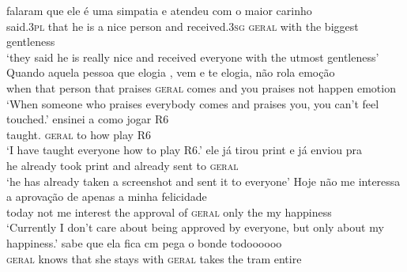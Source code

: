 \documentclass[output=paper]{langscibook}
\begin{document}
\ea\label{ex:avelar:25}
 \ea\label{ex:avelar:25a}
  \gll falaram   que   ele   é   uma simpatia   e   atendeu  com   o   maior     carinho \\ %
  said.\textsc{3pl} that  he   is   a {nice person}   and received.\textsc{3sg} \textsc{geral} with   the  biggest   gentleness\\
  \glt ‘they said he is really nice and received everyone with the utmost gentleness’
  \ex\label{ex:avelar:25b}
   \gll Quando   aquela pessoa  que   elogia , vem   e     te     elogia,   não   rola     emoção\\ %
         when     that person    that   praises   \textsc{geral} comes  and   you   praises not   happen   emotion\\
  \glt ‘When someone who praises everybody comes and praises you, you can’t feel touched.’
 \ex\label{ex:avelar:25c}
  \gll ensinei  a   como   jogar R6 \\
         taught.   \textsc{geral}   to   how   play R6\\
  \glt `I have taught everyone how to play R6.’
\z %
 \ex\label{ex:avelar:26}
  \gll ele  já       tirou   print   e     já       enviou  pra  \\ %
        he   already   took   print  and   already   sent   to     \textsc{geral}\\
  \glt ‘he has already taken a screenshot and sent it to everyone’
\ex\label{ex:avelar:27}
 \gll Hoje   não me  interessa   a  aprovação  de  apenas   a   minha  felicidade \\ %
         today   not me   interest   the  approval     of \textsc{geral} only     the  my   happiness\\
 \glt ‘Currently I don’t care about being approved by everyone, but only about my happiness.’
\ex\label{ex:avelar:28} 
 \gll {} sabe   que   ela   fica   cm  pega   o   bonde  todoooooo\\ %
         \textsc{geral}   knows  that   she   stays   with   \textsc{geral} takes   the  tram   entire\\
\z
\end{document}
